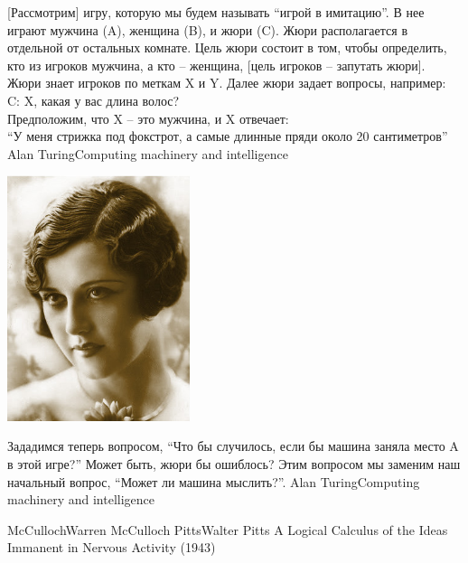 \documentclass[24pt,pdf,hyperref={unicode}]{beamer}
\begin{document}
\begin{frame}
\citate
{
[Рассмотрим] игру, которую мы будем называть ``игрой в имитацию''. В нее играют мужчина (A), женщина (B), и жюри (C). Жюри располагается в отдельной от остальных комнате. Цель жюри состоит в том, чтобы определить, кто из игроков мужчина, а кто -- женщина, [цель игроков -- запутать жюри]. Жюри знает игроков по меткам X и Y. Далее жюри задает вопросы, например:\\[0.2cm]

C: X, какая у вас длина волос? \\[0.2cm]

Предположим, что X -- это мужчина, и X отвечает:\\[0.2cm]

``У меня стрижка под фокстрот, а самые длинные пряди около 20 сантиметров''
}{Alan Turing}{Computing machinery and intelligence}
\end{frame}

\begin{frame}
\begin{center}
\includegraphics[width=0.4\textwidth]{Portraits/Shingled.jpg}
\end{center}
\end{frame}


\begin{frame}

\citate
{
Зададимся теперь вопросом, ``Что бы случилось, если бы машина заняла место A в этой игре?'' Может быть, жюри бы ошиблось? Этим вопросом мы заменим наш начальный вопрос, ``Может ли машина мыслить?''.
}{Alan Turing}{Computing machinery and intelligence}

\end{frame}

\begin{frame}
\doublebio
{McCulloch}{Warren McCulloch}
{Pitts}{Walter Pitts}
{A Logical Calculus of the Ideas Immanent in Nervous Activity (1943)}
\end{frame}
\end{document}

